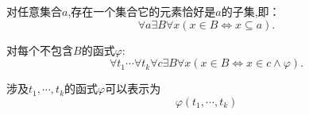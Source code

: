 \begin{axiom}
    对任意集合$a$,存在一个集合它的元素恰好是$a$的子集,即：
    \[\forall a\exists B\forall x(x\in B\iff x\subseteq a).\]
\end{axiom}

\begin{axiom}
    对每个不包含$B$的函式$\varphi$:
    \[\forall t_1\cdots\forall t_k\forall c\exists B\forall x(x\in B\iff x\in c \wedge\varphi).\]
\end{axiom}

\begin{note}
    涉及$t_1,\cdots,t_k$的函式$\varphi$可以表示为
    \[\varphi(t_1,\cdots,t_k)\]
\end{note}

\begin{axiom}
\end{axiom}

\begin{axiom}
\end{axiom}

\begin{axiom}
\end{axiom}
